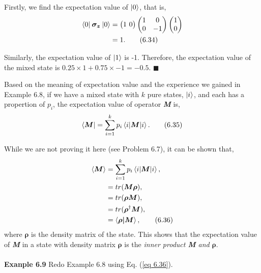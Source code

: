 \documentclass{article}
\newcommand{\bfit}[1]{\textit{\textbf{#1}}}
\begin{document}
Firstly, we find the expectation value of $\ket{0}$, that is, 
\begin{align*}\label{eq 6.34}
    \braket{0| \: \boldsymbol{\sigma_z} \: |0}&=\begin{pmatrix}
        1\ 0
    \end{pmatrix}
    \begin{pmatrix}
        1&0\\0&-1
    \end{pmatrix}
    \begin{pmatrix}
        1\\0
    \end{pmatrix}\\
    &=1.\tag{6.34}
\end{align*}

Similarly, the expectation value of $\ket{1}$ is -1. Therefore,
the expectation value of the mixed state is $0.25 \times 1+0.75 \times -1=-0.5$.
\hfill $\blacksquare$

Based on the meaning of expectation value and the experience we gained in
Example 6.8, if we have a mixed state with $k$ pure states, $\ket{i}$, and each has a propertion
of $p_i$, the expectation value of operator \bfit{M} is,
\begin{equation} \label{eq 6.35}
    \bra{\boldsymbol{M}}=\sum_{i=1}^{k}p_i\braket{i|\boldsymbol{M}|i}.\tag{6.35}
\end{equation}

While we are not proving it here (see Problem 6.7), it can be shown that,
\begin{align*} \label{eq 6.36}
    \braket{\boldsymbol{M}}&=\sum_{i=1}^{k}p_i\braket{i|\boldsymbol{M}|i},\\
    &=tr(\boldsymbol{M}\boldsymbol{\rho}),\\
    &=tr(\boldsymbol{\rho}\boldsymbol{M}),\\
    &=tr(\boldsymbol{\rho}^{\dagger}\boldsymbol{M}),\\
    &=\braket{\boldsymbol{\rho|\boldsymbol{M}}}, \tag{6.36}
\end{align*}
where $\boldsymbol{\rho}$ is the density matrix of the state. This shows that the expectation value of
\bfit{M} in a state with density matrix $\boldsymbol{\rho}$ is the \textit{inner product \textbf{M} and $\boldsymbol{\rho}$}.
\\\\
\textbf{Exanple 6.9} Redo Example 6.8 using Eq. (\ref{eq 6.36}).
\end{document}
